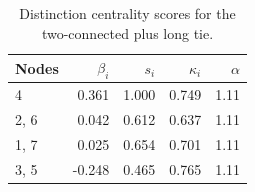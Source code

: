 \begin{table}
\centering
\caption{\label{tab:twoconnectedlong}Distinction centrality scores for the two-connected plus long tie.}
\centering
\begin{tabular}[t]{lrrrr}
\toprule
Nodes & $\beta_i$ & $s_i$ & $\kappa_i$ & $\alpha$\\
\midrule
4 & 0.361 & 1.000 & 0.749 & 1.11\\
2, 6 & 0.042 & 0.612 & 0.637 & 1.11\\
1, 7 & 0.025 & 0.654 & 0.701 & 1.11\\
3, 5 & -0.248 & 0.465 & 0.765 & 1.11\\
\bottomrule
\end{tabular}
\end{table}
